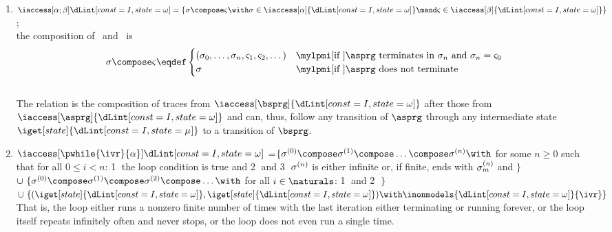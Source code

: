 \documentclass[11pt,twoside]{scrartcl}
\begin{document}
\begin{definition}
\begin{enumerate}
    \item \(\iaccess[{\alpha};{\beta}]{\I} =
      \{\atrace \compose \varsigma \with \atrace\in\iaccess[\alpha]{\I} \mand \varsigma\in\iaccess[\beta]{\I}\}\);\\
      the composition of~ and~ is
      \[
      \atrace \compose \varsigma \eqdef
      \begin{cases}
        (\atrace_0,\dots,\atrace_n,\varsigma_1,\varsigma_2,\dots) &\mylpmi[\text{if}~] \text{$\asprg$ terminates in $\atrace_n$}~\text{and}~\atrace_n=\varsigma_0\\
        \atrace &\mylpmi[\text{if}~] \asprg~\text{does not terminate}
      \end{cases}
      \] \\
      The relation \m{\iaccess[\asprg;\bsprg]{\I}} is the composition of traces from \(\iaccess[\bsprg]{\I}\) after those from \(\iaccess[\asprg]{\I}\) and can, thus, follow any transition of $\asprg$ through any intermediate state $\iget[state]{\Iz}$ to a transition of $\bsprg$.
    
    \item
      \(\iaccess[\pwhile{\ivr}{\alpha}]{\I}\)
=\(\{\atrace^{(0)} \compose \atrace^{(1)} \compose \dots \compose \atrace^{(n)} \with\)
for some $n\geq0$
such that for all $0\leq i<n$:
\textcircled{1} the loop condition is true  and
\textcircled{2}
and \textcircled{3} $\sigma^{(n)}$ is either infinite or, if finite, ends with $\sigma^{(n)}_m$ and $\big\}$
\\
  \(\cup~\{\atrace^{(0)} \compose \atrace^{(1)} \compose \atrace^{(2)} \compose \dots \with\)
for all $i\in\naturals$:
\textcircled{1}  and
\textcircled{2}
$\}$
  \\
  \(\cup~\{(\iget[state]{\I},\iget[state]{\I}) \with \inonmodels{\I}{\ivr}\}\)
  \\
  That is, the loop either runs a nonzero finite number of times with the last iteration either terminating or running forever,
  or the loop itself repeats infinitely often and never stops,
  or the loop does not even run a single time.
    \end{enumerate}
\end{definition}
\end{document}
